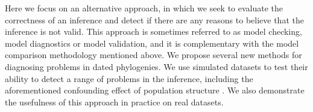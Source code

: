 \documentclass{article}
\begin{document}
Here we focus on an alternative approach, in which we seek to evaluate
the correctness of an inference and detect if there are any reasons to believe that the inference is not valid.
This approach is sometimes referred to as model checking, model diagnostics or model validation, 
and it is complementary with the model comparison methodology mentioned above. 
We propose several new methods for diagnosing problems in dated phylogenies.
We use simulated datasets to test their ability to detect a range of problems
in the inference, including the aforementioned confounding effect of population structure
\citep{Murray2016}. 
We also demonstrate the usefulness of this approach in practice on real datasets.

%
% 
% 
%
\end{document}
